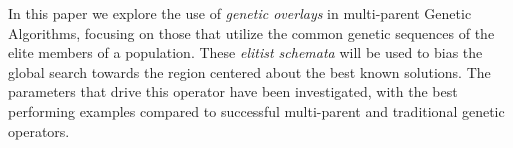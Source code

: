 In this paper we explore the use of \emph{genetic overlays} in multi-parent Genetic Algorithms, focusing on those that utilize the common genetic sequences of the elite members of a population. These \emph{elitist schemata} will be used to bias the global search towards the region centered about the best known solutions. The parameters that drive this operator have been investigated, with the best performing examples compared to successful multi-parent and traditional genetic operators.
